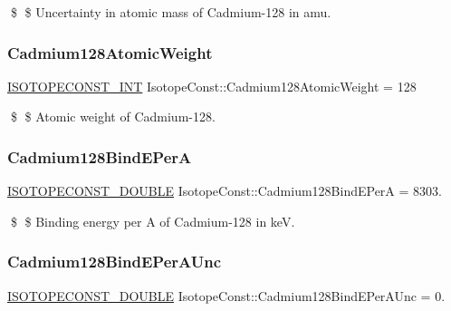 \$ \$ Uncertainty in atomic mass of Cadmium-\/128 in amu. \mbox{\label{group___isotope_const-_cadmium-_cd128_ga4ebe14a207b4e149cd0bfc7fd31a190b}} 
\subsubsection{\texorpdfstring{Cadmium128\+Atomic\+Weight}{Cadmium128AtomicWeight}}
{\footnotesize\ttfamily \mbox{\hyperlink{group___isotope_const-_macros_ga5f18360b3e99483a35c32d789e62621c}{I\+S\+O\+T\+O\+P\+E\+C\+O\+N\+S\+T\+\_\+\+I\+NT}} Isotope\+Const\+::\+Cadmium128\+Atomic\+Weight = 128}

\$ \$ Atomic weight of Cadmium-\/128. \mbox{\label{group___isotope_const-_cadmium-_cd128_ga03c7cc4a5c7e40e69e13708201085f54}} 
\subsubsection{\texorpdfstring{Cadmium128\+Bind\+E\+PerA}{Cadmium128BindEPerA}}
{\footnotesize\ttfamily \mbox{\hyperlink{group___isotope_const-_macros_ga8f45a7272ce02c0b4c65c44636ed719a}{I\+S\+O\+T\+O\+P\+E\+C\+O\+N\+S\+T\+\_\+\+D\+O\+U\+B\+LE}} Isotope\+Const\+::\+Cadmium128\+Bind\+E\+PerA = 8303.}

\$ \$ Binding energy per A of Cadmium-\/128 in keV. \mbox{\label{group___isotope_const-_cadmium-_cd128_ga0e56d4dd5931da42b5274ca47d7b7ba4}} 
\subsubsection{\texorpdfstring{Cadmium128\+Bind\+E\+Per\+A\+Unc}{Cadmium128BindEPerAUnc}}
{\footnotesize\ttfamily \mbox{\hyperlink{group___isotope_const-_macros_ga8f45a7272ce02c0b4c65c44636ed719a}{I\+S\+O\+T\+O\+P\+E\+C\+O\+N\+S\+T\+\_\+\+D\+O\+U\+B\+LE}} Isotope\+Const\+::\+Cadmium128\+Bind\+E\+Per\+A\+Unc = 0.}

